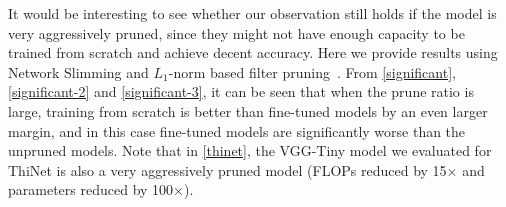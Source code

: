 It would be interesting to see whether our observation still holds if the model is very aggressively pruned, since they might not have enough capacity to be trained from scratch and achieve decent accuracy. Here we provide results using Network Slimming \citep{liu2017learning} and $L_1$-norm based filter pruning~\citep{li2016pruning}.  From \autoref{significant}, \autoref{significant-2} and \autoref{significant-3}, it can be seen that when the prune ratio is large, training from scratch is better than fine-tuned models by an even larger margin, and in this case fine-tuned models are significantly worse than the unpruned models. Note that in \autoref{thinet}, the VGG-Tiny model we evaluated for ThiNet \citep{luo2017thinet} is also a very aggressively pruned model (FLOPs reduced by 15$\times$ and parameters reduced by 100$\times$).
\setlength{\tabcolsep}{4pt}
\renewcommand{\arraystretch}{1.15}
\begin{table}[!htbp]
\vspace{-1ex}
\centering
\small
\vspace{2ex}
\caption{Results (accuracy) for Network Slimming~\citep{liu2017learning} when the models are aggressively pruned. ``Prune ratio'' stands for total percentage of channels that are pruned in the whole network. Larger ratios are used than the original paper of \citet{liu2017learning}. 
}
\label{significant}
\end{table}




